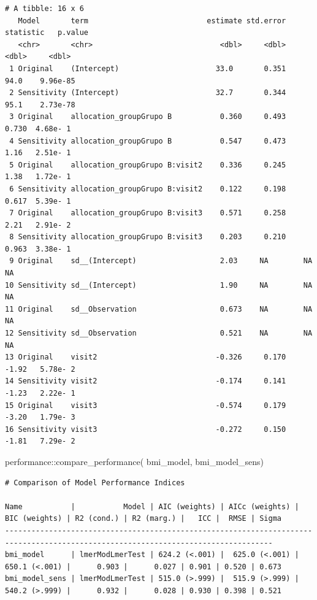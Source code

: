 \documentclass[
  12pt,
]{article}
\newenvironment{Shaded}{\begin{snugshade}}{\end{snugshade}}
\newcommand{\FunctionTok}[1]{\textcolor[rgb]{0.28,0.35,0.67}{#1}}
\newcommand{\NormalTok}[1]{\textcolor[rgb]{0.00,0.23,0.31}{#1}}
\newcommand{\SpecialCharTok}[1]{\textcolor[rgb]{0.37,0.37,0.37}{#1}}
\begin{document}
\begin{verbatim}
# A tibble: 16 x 6
   Model       term                           estimate std.error statistic   p.value
   <chr>       <chr>                             <dbl>     <dbl>     <dbl>     <dbl>
 1 Original    (Intercept)                      33.0       0.351    94.0    9.96e-85
 2 Sensitivity (Intercept)                      32.7       0.344    95.1    2.73e-78
 3 Original    allocation_groupGrupo B           0.360     0.493     0.730  4.68e- 1
 4 Sensitivity allocation_groupGrupo B           0.547     0.473     1.16   2.51e- 1
 5 Original    allocation_groupGrupo B:visit2    0.336     0.245     1.38   1.72e- 1
 6 Sensitivity allocation_groupGrupo B:visit2    0.122     0.198     0.617  5.39e- 1
 7 Original    allocation_groupGrupo B:visit3    0.571     0.258     2.21   2.91e- 2
 8 Sensitivity allocation_groupGrupo B:visit3    0.203     0.210     0.963  3.38e- 1
 9 Original    sd__(Intercept)                   2.03     NA        NA     NA       
10 Sensitivity sd__(Intercept)                   1.90     NA        NA     NA       
11 Original    sd__Observation                   0.673    NA        NA     NA       
12 Sensitivity sd__Observation                   0.521    NA        NA     NA       
13 Original    visit2                           -0.326     0.170    -1.92   5.78e- 2
14 Sensitivity visit2                           -0.174     0.141    -1.23   2.22e- 1
15 Original    visit3                           -0.574     0.179    -3.20   1.79e- 3
16 Sensitivity visit3                           -0.272     0.150    -1.81   7.29e- 2
\end{verbatim}

\begin{Shaded}
\begin{Highlighting}[]
\NormalTok{performance}\SpecialCharTok{::}\FunctionTok{compare\_performance}\NormalTok{(}
\NormalTok{    bmi\_model, }
\NormalTok{    bmi\_model\_sens) }
\end{Highlighting}
\end{Shaded}

\begin{verbatim}
# Comparison of Model Performance Indices

Name           |           Model | AIC (weights) | AICc (weights) | BIC (weights) | R2 (cond.) | R2 (marg.) |   ICC |  RMSE | Sigma
-----------------------------------------------------------------------------------------------------------------------------------
bmi_model      | lmerModLmerTest | 624.2 (<.001) |  625.0 (<.001) | 650.1 (<.001) |      0.903 |      0.027 | 0.901 | 0.520 | 0.673
bmi_model_sens | lmerModLmerTest | 515.0 (>.999) |  515.9 (>.999) | 540.2 (>.999) |      0.932 |      0.028 | 0.930 | 0.398 | 0.521
\end{verbatim}
\end{document}
